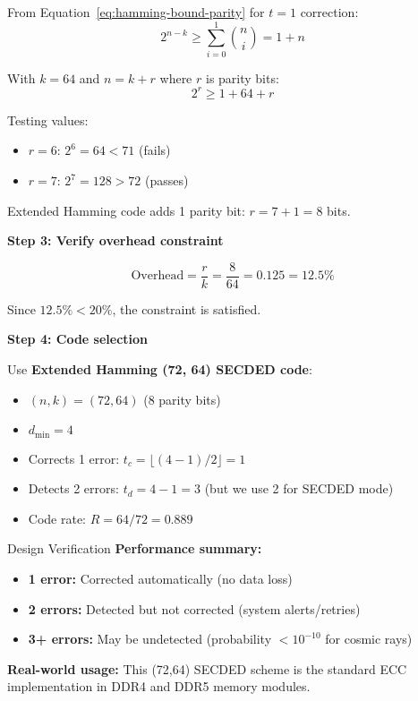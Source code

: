From Equation~\ref{eq:hamming-bound-parity} for $t = 1$ correction:
\begin{equation}
2^{n-k} \geq \sum_{i=0}^{1} \binom{n}{i} = 1 + n
\end{equation}

With $k = 64$ and $n = k + r$ where $r$ is parity bits:
\begin{equation}
2^r \geq 1 + 64 + r
\end{equation}

Testing values:
\begin{itemize}
\item $r = 6$: $2^6 = 64 < 71$ (fails)
\item $r = 7$: $2^7 = 128 > 72$ (passes)
\end{itemize}

Extended Hamming code adds 1 parity bit: $r = 7 + 1 = 8$ bits.

\textbf{Step 3: Verify overhead constraint}

\begin{equation}
\text{Overhead} = \frac{r}{k} = \frac{8}{64} = 0.125 = 12.5\%
\end{equation}

Since $12.5\% < 20\%$, the constraint is satisfied.

\textbf{Step 4: Code selection}

Use \textbf{Extended Hamming (72, 64) SECDED code}:
\begin{itemize}
\item $(n, k) = (72, 64)$ (8 parity bits)
\item $d_{\min} = 4$
\item Corrects 1 error: $t_c = \lfloor(4-1)/2\rfloor = 1$
\item Detects 2 errors: $t_d = 4 - 1 = 3$ (but we use 2 for SECDED mode)
\item Code rate: $R = 64/72 = 0.889$
\end{itemize}

\begin{calloutbox}{Design Verification}
\textbf{Performance summary:}
\begin{itemize}
\item \textbf{1 error:} Corrected automatically (no data loss)
\item \textbf{2 errors:} Detected but not corrected (system alerts/retries)
\item \textbf{3+ errors:} May be undetected (probability $< 10^{-10}$ for cosmic rays)
\end{itemize}

\textbf{Real-world usage:} This (72,64) SECDED scheme is the standard ECC implementation in DDR4 and DDR5 memory modules.
\end{calloutbox}


